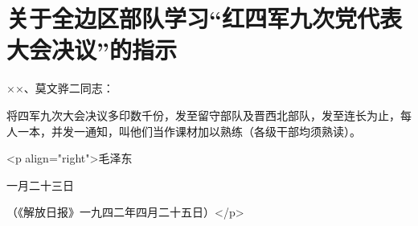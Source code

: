 \section[关于全边区部队学习“红四军九次党代表大会决议”的指示（一九四二年一月二十三日）]{关于全边区部队学习“红四军九次党代表大会决议”的指示}


××、莫文骅二同志：

将四军九次大会决议多印数千份，发至留守部队及晋西北部队，发至连长为止，每人一本，并发一通知，叫他们当作课材加以熟练（各级干部均须熟读）。

<p align="right">毛泽东

一月二十三日

（《解放日报》一九四二年四月二十五日）</p>

